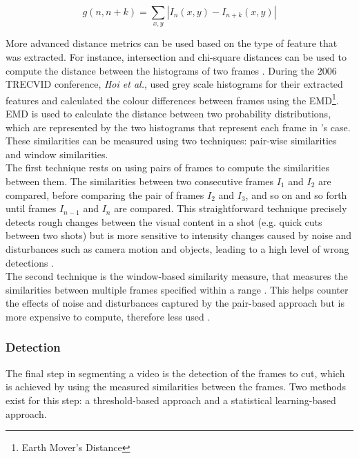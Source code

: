 \begin{equation}
\label{eq:absolutevalue}
    g(n,n+k) = \sum _{x,y} | I_n(x,y) - I_{n+k}(x,y) |
\end{equation}

More advanced distance metrics can be used based on the type of feature that was extracted. For instance, intersection and chi-square distances can be used to compute the distance between the histograms of two frames \cite[p.197]{camara2007shot}. During the 2006 TRECVID conference, \textit{Hoi et al.}, used grey scale histograms for their extracted features and calculated the colour differences between frames using the EMD\footnote{Earth Mover's Distance}. EMD is used to calculate the distance between two probability distributions, which are represented by the two histograms that represent each frame in \cite[p.2]{hoi2006trecvid06}'s case. These similarities can be measured using two techniques: pair-wise similarities and window similarities.\\

The first technique rests on using pairs of frames to compute the similarities between them. The similarities between two consecutive frames $I_1$ and $I_2$ are compared, before comparing the pair of frames $I_2$ and $I_3$, and so on and so forth until frames $I_{n-1}$ and $I_n$ are compared. This straightforward technique precisely detects rough changes between the visual content in a shot (e.g. quick cuts between two shots) but is more sensitive to intensity changes caused by noise and disturbances such as camera motion and objects, leading to a high level of wrong detections \cite{janwe2013video}.\\

The second technique is the window-based similarity measure, that measures the similarities between multiple frames specified within a range \cite{cernekova2006information}. This helps counter the effects of noise and disturbances captured by the pair-based approach but is more expensive to compute, therefore less used \cite{hu2011survey}.

\subsubsection{Detection}
\label{sec:litsurvey-shot-boundary-detection}

The final step in segmenting a video is the detection of the frames to cut, which is achieved by using the measured similarities between the frames. Two methods exist for this step: a threshold-based approach and a statistical learning-based approach.\\

